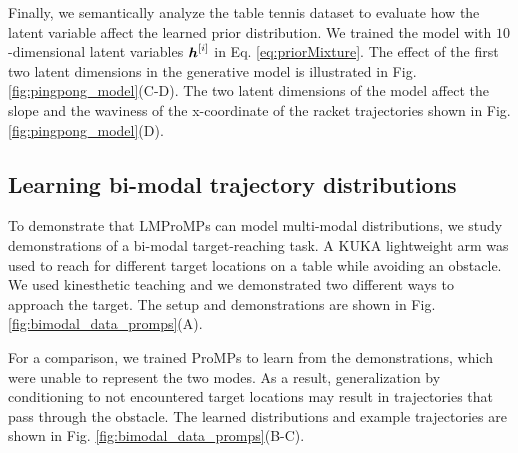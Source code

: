 
Finally, we semantically analyze the table tennis dataset to evaluate how the
latent variable affect the learned prior distribution.  We trained the
model with $10$-dimensional latent variables $\boldsymbol{h}^{[i]} $
in Eq. \eqref{eq:priorMixture}. The effect of the first two latent dimensions
in the generative model is illustrated in Fig. \ref{fig:pingpong_model}(C-D).
The two latent dimensions of the model affect the slope and the waviness of the
x-coordinate of the racket trajectories shown in Fig. \ref{fig:pingpong_model}(D).


\subsection{Learning bi-modal trajectory distributions}

To demonstrate that LMProMPs can model multi-modal distributions,  
we study demonstrations of a bi-modal target-reaching task. 
A KUKA lightweight arm was used to reach for 
different target locations on a table while avoiding an obstacle. 
We used kinesthetic teaching and we demonstrated two different ways to approach the target. The
setup and demonstrations are shown in Fig. \ref{fig:bimodal_data_promps}(A). 

For a comparison, we trained ProMPs to learn from the demonstrations, 
which were unable to represent the two modes. 
As a result, generalization by
conditioning to not encountered target locations may result in trajectories that pass
through the obstacle. The learned distributions and example trajectories are shown in Fig. \ref{fig:bimodal_data_promps}(B-C).

  
